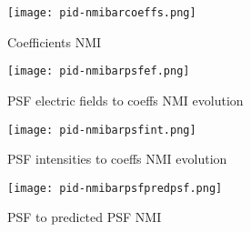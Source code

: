 		\begin{figure*}[ht!]
			\centering
			\caption{Coefficients NMI}
			\texttt{[image: pid-nmibarcoeffs.png]}
		\end{figure*}
		
		\begin{figure*}[ht!]
			\centering
			\caption{PSF electric fields to coeffs NMI evolution}
				\texttt{[image: pid-nmibarpsfef.png]}
		\end{figure*}
		
		\begin{figure*}[ht!]
			\centering
			\caption{PSF intensities to coeffs NMI evolution}
				\texttt{[image: pid-nmibarpsfint.png]}
		\end{figure*}
		
		\begin{figure*}[ht!]
			\centering
			\caption{PSF to predicted PSF NMI}
				\texttt{[image: pid-nmibarpsfpredpsf.png]}
		\end{figure*}
		\FloatBarrier
		
		
	
